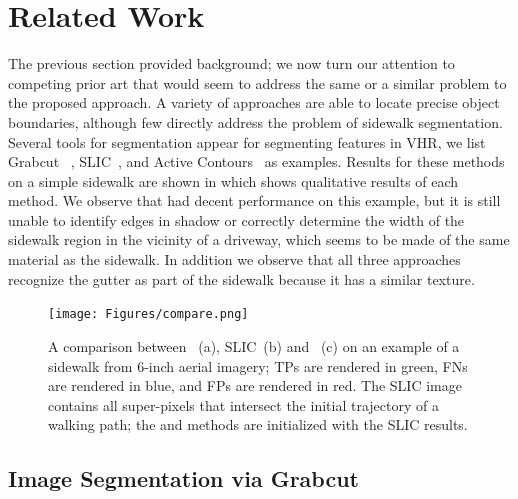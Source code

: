 \chapter{Related Work}

The previous section provided background; we now turn our attention to competing prior art that would seem to address the same or a similar problem to the proposed approach. 
A variety of approaches are able to locate precise object boundaries, although few directly address
the problem of sidewalk segmentation. Several tools for segmentation
appear for segmenting features in \ac{VHR}, we list Grabcut ~\cite{Rother2004-ou},
SLIC~\cite{Achanta:149300}, and Active Contours~\cite{Kass88snakes:active} as examples. 
Results for
these methods on a simple sidewalk are shown in  which shows
qualitative results of each method. We observe that \GrabCut{} had decent performance on this example,
but it is still unable to identify edges in shadow or correctly determine the width of the sidewalk
region in the vicinity of a driveway, which seems to be made of the same material as the sidewalk.
In addition we observe that all three approaches recognize the gutter as part of the sidewalk
because it has a similar texture.

\begin{figure}[H]
    \centering
    \texttt{[image: Figures/compare.png]}
    \caption[Method comparison with Grabcut, Active Contours, and Slic]{
        A comparison between \GrabCut{}~(a), SLIC~(b) and \ActiveContours{}~(c) 
        on an example of a sidewalk from 6-inch aerial imagery; 
        \aclp{TP} are rendered in green, 
        \aclp{FN} are rendered in blue, and 
        \aclp{FP} are rendered in red.
        The SLIC image contains all super-pixels that intersect 
        the initial trajectory of a walking path; 
        the \ActiveContours{} and \GrabCut{} methods are initialized with the SLIC results.
    }
    \label{fig:Method_comparison}
\end{figure}

\section{Image Segmentation via Grabcut} 

